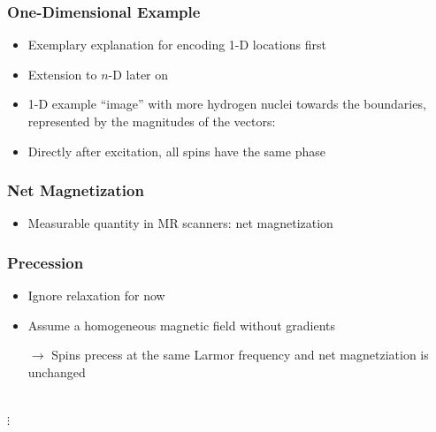 \begin{frame}
	\frametitle{One-Dimensional Example}
	
	\begin{itemize}
		\item Exemplary explanation for encoding 1-D locations first
		\item Extension to $n$-D later on
		\item 1-D example ``image'' with more hydrogen nuclei towards the boundaries, represented by the magnitudes of the vectors:
	\end{itemize}
	
	\begin{center}
		\begingroup
		
		\endgroup
	\end{center}
	
	\begin{itemize}
		\item Directly after excitation, all spins have the same phase
	\end{itemize}
\end{frame}

\begin{frame}
	\frametitle{Net Magnetization}
	
	\begin{itemize}
		\item Measurable quantity in MR scanners: net magnetization
	\end{itemize}
	
	\begin{center}
		\begingroup
		
		\endgroup
	\end{center}
	
\end{frame}

\begin{frame}
	\frametitle{Precession}
	
	\begin{itemize}
		\item Ignore relaxation for now
		\item Assume a homogeneous magnetic field without gradients
		\item[$\rightarrow$] Spins precess at the same Larmor frequency and net magnetziation is unchanged
	\end{itemize}
	
	\begin{center}
		\begingroup
		 \\
		$\vdots$
		\endgroup
	\end{center}
\end{frame}

